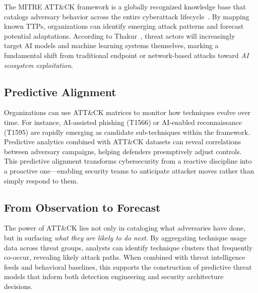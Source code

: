 \documentclass[sigconf,nonacm]{acmart}
\begin{document}
The MITRE ATT\&CK framework is a globally recognized knowledge base that catalogs
adversary behavior across the entire cyberattack lifecycle~\cite{mitre2025}. By mapping
known TTPs, organizations can identify emerging attack patterns and forecast potential
adaptations. According to Thakur~\cite{thakur2025}, threat actors will increasingly
target AI models and machine learning systems themselves, marking a fundamental shift
from traditional endpoint or network-based attacks toward \emph{AI ecosystem exploitation}.

\subsection{Predictive Alignment}

Organizations can use ATT\&CK matrices to monitor how techniques evolve over time.
For instance, AI-assisted phishing (T1566) or AI-enabled reconnaissance (T1595) are
rapidly emerging as candidate sub-techniques within the framework. Predictive analytics
combined with ATT\&CK datasets can reveal correlations between adversary campaigns,
helping defenders preemptively adjust controls. This predictive alignment transforms
cybersecurity from a reactive discipline into a proactive one---enabling security teams
to anticipate attacker moves rather than simply respond to them.

\subsection{From Observation to Forecast}

The power of ATT\&CK lies not only in cataloging what adversaries have done, but
in surfacing \emph{what they are likely to do next}. By aggregating technique usage data
across threat groups, analysts can identify technique clusters that frequently co-occur,
revealing likely attack paths. When combined with threat intelligence feeds and behavioral
baselines, this supports the construction of predictive threat models that inform both
detection engineering and security architecture decisions.
\end{document}
